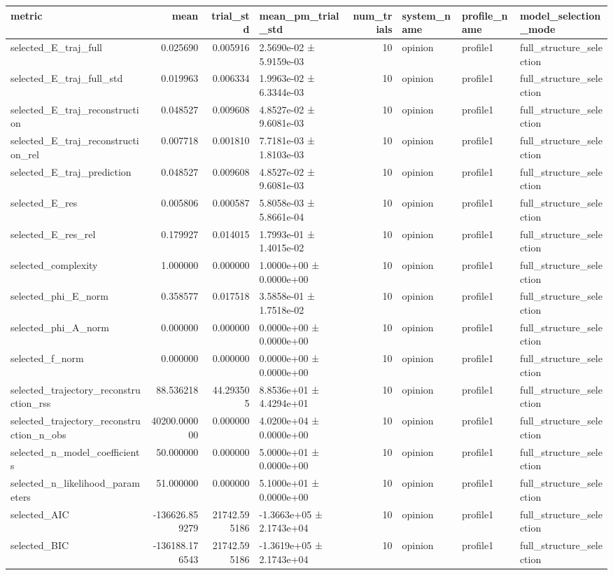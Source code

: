 \begin{tabular}{lrrlrlll}
\toprule
metric & mean & trial_std & mean_pm_trial_std & num_trials & system_name & profile_name & model_selection_mode \\
\midrule
selected_E_traj_full & 0.025690 & 0.005916 & 2.5690e-02 ± 5.9159e-03 & 10 & opinion & profile1 & full_structure_selection \\
selected_E_traj_full_std & 0.019963 & 0.006334 & 1.9963e-02 ± 6.3344e-03 & 10 & opinion & profile1 & full_structure_selection \\
selected_E_traj_reconstruction & 0.048527 & 0.009608 & 4.8527e-02 ± 9.6081e-03 & 10 & opinion & profile1 & full_structure_selection \\
selected_E_traj_reconstruction_rel & 0.007718 & 0.001810 & 7.7181e-03 ± 1.8103e-03 & 10 & opinion & profile1 & full_structure_selection \\
selected_E_traj_prediction & 0.048527 & 0.009608 & 4.8527e-02 ± 9.6081e-03 & 10 & opinion & profile1 & full_structure_selection \\
selected_E_res & 0.005806 & 0.000587 & 5.8058e-03 ± 5.8661e-04 & 10 & opinion & profile1 & full_structure_selection \\
selected_E_res_rel & 0.179927 & 0.014015 & 1.7993e-01 ± 1.4015e-02 & 10 & opinion & profile1 & full_structure_selection \\
selected_complexity & 1.000000 & 0.000000 & 1.0000e+00 ± 0.0000e+00 & 10 & opinion & profile1 & full_structure_selection \\
selected_phi_E_norm & 0.358577 & 0.017518 & 3.5858e-01 ± 1.7518e-02 & 10 & opinion & profile1 & full_structure_selection \\
selected_phi_A_norm & 0.000000 & 0.000000 & 0.0000e+00 ± 0.0000e+00 & 10 & opinion & profile1 & full_structure_selection \\
selected_f_norm & 0.000000 & 0.000000 & 0.0000e+00 ± 0.0000e+00 & 10 & opinion & profile1 & full_structure_selection \\
selected_trajectory_reconstruction_rss & 88.536218 & 44.293505 & 8.8536e+01 ± 4.4294e+01 & 10 & opinion & profile1 & full_structure_selection \\
selected_trajectory_reconstruction_n_obs & 40200.000000 & 0.000000 & 4.0200e+04 ± 0.0000e+00 & 10 & opinion & profile1 & full_structure_selection \\
selected_n_model_coefficients & 50.000000 & 0.000000 & 5.0000e+01 ± 0.0000e+00 & 10 & opinion & profile1 & full_structure_selection \\
selected_n_likelihood_parameters & 51.000000 & 0.000000 & 5.1000e+01 ± 0.0000e+00 & 10 & opinion & profile1 & full_structure_selection \\
selected_AIC & -136626.859279 & 21742.595186 & -1.3663e+05 ± 2.1743e+04 & 10 & opinion & profile1 & full_structure_selection \\
selected_BIC & -136188.176543 & 21742.595186 & -1.3619e+05 ± 2.1743e+04 & 10 & opinion & profile1 & full_structure_selection \\
\bottomrule
\end{tabular}
